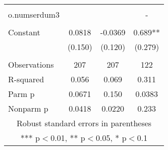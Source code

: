 \documentclass[]{article}
\begin{document}
\begin{tabular}{lccc}
 &  &  &  \\
o.numserdum3 &  &  & - \\
 &  &  &  \\
Constant & 0.0818 & -0.0369 & 0.689** \\
 & (0.150) & (0.120) & (0.279) \\
 &  &  &  \\
Observations & 207 & 207 & 122 \\
R-squared & 0.056 & 0.069 & 0.311 \\
Parm p & 0.0671 & 0.150 & 0.0383 \\
 Nonparm p & 0.0418 & 0.0220 & 0.233 \\ \hline
\multicolumn{4}{c}{ Robust standard errors in parentheses} \\
\multicolumn{4}{c}{ *** p$<$0.01, ** p$<$0.05, * p$<$0.1} \\
\end{tabular}
\end{document}
